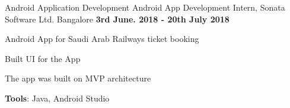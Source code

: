 \begin{cventries}
    \cventry
    {Android Application Development}
    {Android App Development Intern, Sonata Software Ltd.}
    {Bangalore}
    {\textbf{3rd June. 2018 - 20th July 2018}}
    {
      \begin{cvitems}
        \item {Android App for Saudi Arab Railways ticket booking}
        \item {Built UI for the App}
        \item{The app was built on MVP architecture}
        \item{\textbf{Tools}: Java, Android Studio}
      \end{cvitems}
    }
\end{cventries}  

